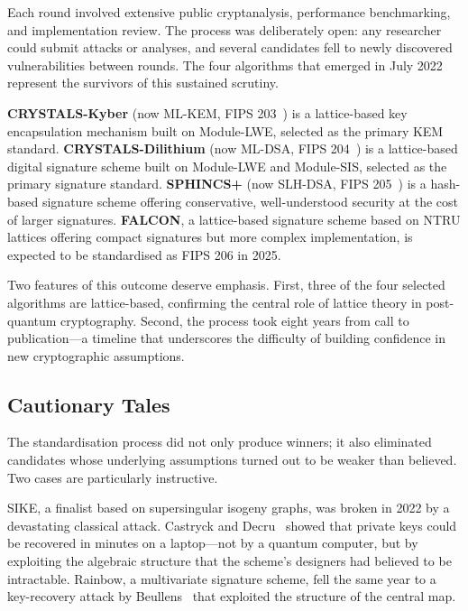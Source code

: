 Each round involved extensive public cryptanalysis, performance benchmarking, and implementation review.  The process was deliberately open: any researcher could submit attacks or analyses, and several candidates fell to newly discovered vulnerabilities between rounds.  The four algorithms that emerged in July 2022 represent the survivors of this sustained scrutiny.

\textbf{CRYSTALS-Kyber} (now ML-KEM, FIPS 203~\cite{FIPS203}) is a lattice-based key encapsulation mechanism built on Module-LWE, selected as the primary KEM standard.  \textbf{CRYSTALS-Dilithium} (now ML-DSA, FIPS 204~\cite{FIPS204}) is a lattice-based digital signature scheme built on Module-LWE and Module-SIS, selected as the primary signature standard.  \textbf{SPHINCS+} (now SLH-DSA, FIPS 205~\cite{FIPS205}) is a hash-based signature scheme offering conservative, well-understood security at the cost of larger signatures.  \textbf{FALCON}, a lattice-based signature scheme based on NTRU lattices offering compact signatures but more complex implementation, is expected to be standardised as FIPS 206 in 2025.

Two features of this outcome deserve emphasis.  First, three of the four selected algorithms are lattice-based, confirming the central role of lattice theory in post-quantum cryptography.  Second, the process took eight years from call to publication---a timeline that underscores the difficulty of building confidence in new cryptographic assumptions.

\subsection{Cautionary Tales}

The standardisation process did not only produce winners; it also eliminated candidates whose underlying assumptions turned out to be weaker than believed.  Two cases are particularly instructive.

SIKE, a finalist based on supersingular isogeny graphs, was broken in 2022 by a devastating classical attack.  Castryck and Decru~\cite{CastryckDecru2023} showed that private keys could be recovered in minutes on a laptop---not by a quantum computer, but by exploiting the algebraic structure that the scheme's designers had believed to be intractable.  Rainbow, a multivariate signature scheme, fell the same year to a key-recovery attack by Beullens~\cite{Beullens2022} that exploited the structure of the central map.


